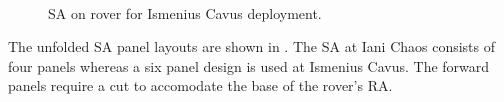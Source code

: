 \begin{figure}[h]
\begin{subfigure}[t]{\subfigureWidth}
		\label{fig:sub:solar-array-on-rover-for-ismenius-cavus-deployed}
	\end{subfigure}\\[0.8ex]
    \caption[Solar array on rover for Ismenius Cavus deployment]
            {\ac{SA} on rover for Ismenius Cavus deployment.}
    \label{fig:solar-array-on-ismenius-cavus-chaos}
\vspace{-2ex}
\end{figure}

\clearpage
The unfolded \ac{SA} panel layouts are shown in . The \ac{SA} at Iani Chaos consists of four panels whereas a six panel design is used at Ismenius Cavus. The forward panels require a cut to accomodate the base of the rover's \ac{RA}.

\vspace{0.5cm}

